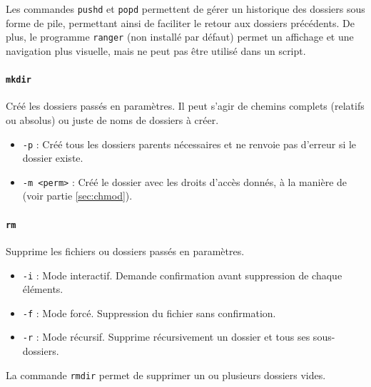  Les commandes \texttt{pushd} et \texttt{popd} permettent de gérer un historique des dossiers sous forme de pile, permettant ainsi de faciliter le retour aux dossiers précédents. \newline 
De plus, le programme \texttt{ranger} (non installé par défaut) permet un affichage et une navigation plus visuelle, mais ne peut pas être utilisé dans un script.

\paragraph{\texttt{mkdir}} 
Créé les dossiers passés en paramètres. Il peut s'agir de chemins complets (relatifs ou absolus) ou juste de noms de dossiers à créer.
\begin{itemize}
    \item \texttt{-p} : Créé tous les dossiers parents nécessaires et ne renvoie pas d'erreur si le dossier existe.
    \item \texttt{-m <perm>} : Créé le dossier avec les droits d'accès donnés, à la manière de  (voir partie \ref{sec:chmod}).
\end{itemize}

\paragraph{\texttt{rm}} 
Supprime les fichiers ou dossiers passés en paramètres.
\begin{itemize}
    \item \texttt{-i} : Mode interactif. Demande confirmation avant suppression de chaque éléments.
    \item \texttt{-f} : Mode forcé. Suppression du fichier sans confirmation.
    \item \texttt{-r} : Mode récursif. Supprime récursivement un dossier et tous ses sous-dossiers.
\end{itemize}
\vspace{3mm}

 La commande \texttt{rmdir} permet de supprimer un ou plusieurs dossiers vides.

\newpage

